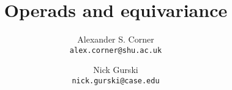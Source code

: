 \documentclass{article} %
\title{Operads and equivariance}
\author{
  Alexander S. Corner\\
  \texttt{alex.corner@shu.ac.uk}
  \and
  Nick Gurski\\
  \texttt{nick.gurski@case.edu}
}
\date{}
\theoremstyle{example}
\begin{document}
\maketitle

\tableofcontents

\abstract























% 

% 

% 

% 





% 
%   

\printbibliography
\end{document}
